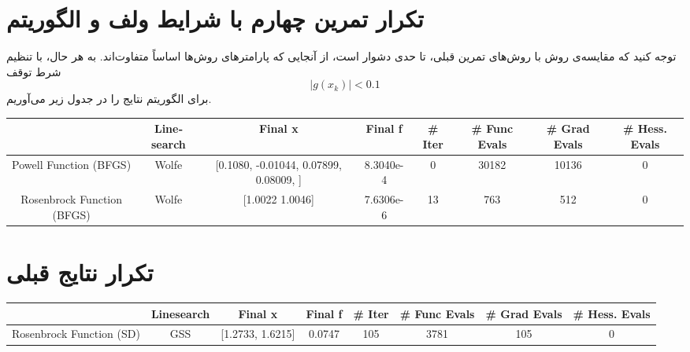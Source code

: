 \documentclass{article}
\begin{document}
\begin{landscape}

 \section{تکرار تمرین چهارم با شرایط ولف و الگوریتم
}
توجه کنید که مقایسه‌ی روش 
با روش‌های تمرین قبلی، تا حدی دشوار است، از آنجایی که پارامتر‌های روش‌ها اساساً متفاوت‌اند. به هر حال، با تنظیم شرط توقف
 $$|g(x_k)| < 0.1$$
 برای الگوریتم 
 نتایج را در جدول زیر می‌آوریم.
 
 
 \begin{latin}
 	\begin{table}[h!]
 		\begin{tabular}{|c|c|c|c|c|c|c|c|}
 			\hline
 			
 			& Linesearch & \textbf{Final x}  & Final f    & \# Iter & \# Func Evals  &\# Grad Evals & \# Hess. Evals \\ \hline
 			
 			Powell Function  (BFGS)     & Wolfe    & {[}0.1080,
 			 -0.01044,
 			  0.07899,
 			 0.08009, {]}                                          & 8.3040e-4     & 0 &30182     & 10136          & 0             \\	
 			
 			Rosenbrock Function  (BFGS)     & Wolfe    & {[}1.0022 1.0046{]}                                          &      7.6306e-6
 			& 13     & 763         & 512          & 0              \\	
 			
 			\hline
 			
 		\end{tabular}
 	\end{table}
 \end{latin}


\section{تکرار نتایج قبلی}
\begin{latin}
\begin{table}[h!]
	\begin{tabular}{|c|c|c|c|c|c|c|c|}
		\hline
		
		& Linesearch & \textbf{Final x}  & Final f    & \# Iter & \# Func Evals  &\# Grad Evals & \# Hess. Evals \\ \hline
											
		Rosenbrock Function  (SD)     & GSS    & {[}1.2733, 1.6215{]}                                          & 0.0747     & 105     & 3781          & 105           & 0              \\	
			

\end{tabular}
\end{table}
\end{latin}
\end{landscape}
\end{document}
